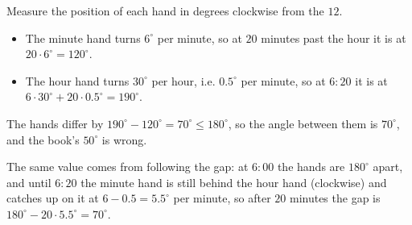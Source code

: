 Measure the position of each hand in degrees clockwise from the $12$.
\begin{itemize}
\item The minute hand turns $6^\circ$ per minute, so at $20$ minutes past the hour it is at $20\cdot6^\circ=120^\circ$.
\item The hour hand turns $30^\circ$ per hour, i.e. $0.5^\circ$ per minute, so at $6{:}20$ it is at $6\cdot30^\circ+20\cdot0.5^\circ=190^\circ$.
\end{itemize}
The hands differ by $190^\circ-120^\circ=70^\circ\le180^\circ$, so the angle between them is $\boxed{70^\circ}$, and the book's $50^\circ$ is wrong.

The same value comes from following the gap: at $6{:}00$ the hands are $180^\circ$ apart, and until $6{:}20$ the minute hand is still behind the hour hand (clockwise) and catches up on it at $6-0.5=5.5^\circ$ per minute, so after $20$ minutes the gap is $180^\circ-20\cdot5.5^\circ=70^\circ$.
